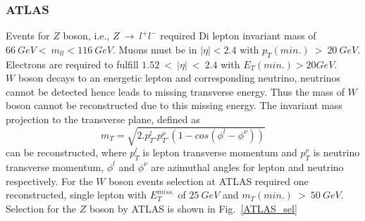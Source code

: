 \subsubsection{ATLAS}
Events for $Z$ boson, i.e., $Z~\rightarrow~l^{+}l^{-}$ required Di lepton invariant mass of $66~GeV<~m_{ll}<116~GeV$. Muons must be in $|\eta|<2.4$ with $p_{T}(min.)~>~20~GeV$. Electrons are required to fulfill $1.52~<~|\eta|~<~2.4$ with $E_{T}(min.)>20GeV$.\\
$W$ boson decays to an energetic lepton and corresponding neutrino, neutrinos cannot be detected hence leads to missing transverse energy. Thus the mass of $W$ boson cannot be reconstructed due to this missing energy. The invariant mass projection to the transverse plane, defined as
\begin{equation}
m_{T}=\sqrt{2.p_{T}^{l}.p_{T}^{\nu}.(1-cos(\phi^{l}-\phi^{\nu}))}
\end{equation} 
can be reconstructed, where $p_{T}^{l}$ is lepton transverse momentum and $p_{T}^{\nu}$ is neutrino transverse momentum, $\phi^{l}$ and $\phi^{\nu}$ are azimuthal angles for lepton and neutrino respectively. For the $W$ boson events selection at ATLAS required one reconstructed, single lepton with $E_{T}^{miss.}$ of $25~GeV$ and $m_{T}(min.)~>~50~GeV$. Selection for the $Z$ boson by ATLAS is shown in Fig.~\ref{ATLAS_sel}
